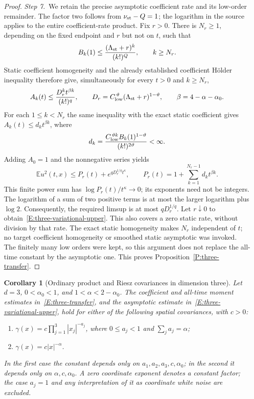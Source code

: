 \documentclass[12pt,oneside,openany]{book}
\makeatletter
\let\lean@pending\@empty
\newcommand{\LeanMarker}[1]{\gdef\lean@pending{#1}}
\numberwithin{equation}{section}
\newtheorem{corollary}[theorem]{Corollary}
\theoremstyle{nogostyle}
\theoremstyle{definition}
\newcommand{\E}{\mathbb{E}}
\makeatother
\begin{document}
\begin{proof}
  \medskip
  \noindent\textit{Step 7.~}We retain the precise asymptotic coefficient rate
  and its low-order remainder.
  The factor two follows from $\nu_{\rm st}-Q = 1$; the logarithm in the source
  applies to the entire coefficient-rate product. Fix $r > 0$. There is $N_r \ge
  1$, depending on the fixed endpoint and $r$ but not on $t$, such that
  \[
    B_k(1)\le\frac{(\Lambda_{\rm st}+r)^k}{(k!)^Q},
    \qquad k\ge N_r.
  \]
  Static coefficient homogeneity and the already established coefficient
  H\"older inequality therefore give, simultaneously for every $t > 0$ and $k
  \ge N_r$,
  \[
    A_k(t)\le\frac{D_r^k t^{\beta k}}{(k!)^q},\qquad
    D_r=C_{\rm low}^{\,\vartheta}(\Lambda_{\rm st}+r)^{1-\vartheta},
    \qquad \beta=4-\alpha-\alpha_0.
  \]
  For each $1 \le k < N_r$ the same inequality with the exact static coefficient
  gives $A_k(t) \le d_kt^{\beta k}$, where
  \[
    d_k=\frac{C_{\rm low}^{\,\vartheta k}
    B_k(1)^{1-\vartheta}}{(k!)^{2\vartheta}}<\infty.
  \]
  Adding $A_0 = 1$ and the nonnegative series yields
  \[
    \E u^2(t,x)\le P_r(t)+e^{qD_r^{1/q}t^\kappa},\qquad
    P_r(t)=1+\sum_{k=1}^{N_r-1}d_kt^{\beta k}.
  \]
  This finite power sum has $\log P_r(t)/t^\kappa \to 0$; its exponents need not
  be integers. The logarithm of a sum of two positive terms is at most the
  larger logarithm plus $\log2$. Consequently, the required limsup is at most
  $qD_r^{1/q}$. Let $r\downarrow0$ to obtain~\eqref{E:three-variational-upper}.
  This also covers a zero static rate, without division by that rate. The exact
  static homogeneity makes $N_r$ independent of $t$; no target coefficient
  homogeneity or smoothed static asymptotic was invoked. The finitely many low
  orders were kept, so this argument does not replace the all-time constant by
  the asymptotic one. This proves Proposition~\ref{P:three-transfer}.
\end{proof}

\LeanMarker{C:three-product-riesz}
\begin{corollary}[Ordinary product and Riesz covariances in dimension three]
  \label{C:three-product-riesz}
  Let $d = 3$, $0 < \alpha_0 < 1$, and $1 < \alpha < 2-\alpha_0$. The
  coefficient and all-time moment estimates in~\eqref{E:three-transfer}, and the
  asymptotic estimate in~\eqref{E:three-variational-upper}, hold for either of
  the following spatial covariances, with $c > 0$:
  \begin{enumerate}
    \item $\gamma(x) = c\prod_{j=1}^3|x_j|^{-a_j}$, where
      $0 \le a_j < 1$ and $\sum_j a_j = \alpha$;
    \item $\gamma(x) = c|x|^{-\alpha}$.
  \end{enumerate}
  In the first case the constant depends only on $a_1,a_2,a_3,c,\alpha_0$; in
  the second it depends only on $\alpha,c,\alpha_0$. A zero coordinate exponent
  denotes a constant factor; the case $a_j = 1$ and any interpretation of it as
  coordinate white noise are excluded.
\end{corollary}
\end{document}
